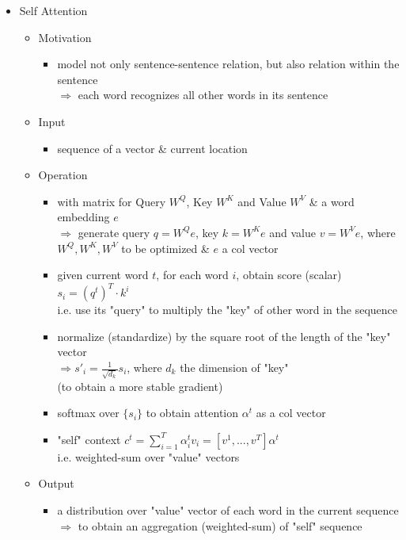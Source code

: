 \begin{itemize}
\item Self Attention
	\begin{itemize}
	\item Motivation
		\begin{itemize}
		\item model not only sentence-sentence relation, but also relation within the sentence \\
		$\Rightarrow$ each word recognizes all other words in its sentence
		\end{itemize}
	\item Input
		\begin{itemize}
		\item sequence of a vector \& current location
		\end{itemize}
	\item Operation
		\begin{itemize}
		\item with matrix for Query $W^Q$, Key $W^K$ and Value $W^V$ \& a word embedding $e$ \\
		$\Rightarrow$ generate query $q=W^Q e$, key $k=W^K e$ and value $v=W^V e$, where \\
		$W^Q, W^K, W^V$ to be optimized \& $e$ a col vector
		\item given current word $t$, for each word $i$, obtain score (scalar) $s_i=(q^t)^T\cdot {k^i}$ \\
		i.e. use its "query" to multiply the "key" of other word in the sequence
		\item normalize (standardize) by the square root of the length of the "key" vector \\
		$\Rightarrow s'_i=\frac {1} {\sqrt{d_k}} s_i$, where $d_k$ the dimension of "key" \\
		(to obtain a more stable gradient)
		\item softmax over $\{s_i\}$ to obtain attention $\alpha^t$ as a col vector
		\item "self" context $c^t = \sum_{i=1}^{T}\alpha^t_iv_i = [v^1,...,v^{T}]\alpha^t$ \\
		i.e. weighted-sum over "value" vectors
		\end{itemize}
	\item Output
		\begin{itemize}
		\item a distribution over "value" vector of each word in the current sequence \\
		$\Rightarrow$ to obtain an aggregation (weighted-sum) of "self" sequence
		\end{itemize}

\end{itemize}
\end{itemize}
